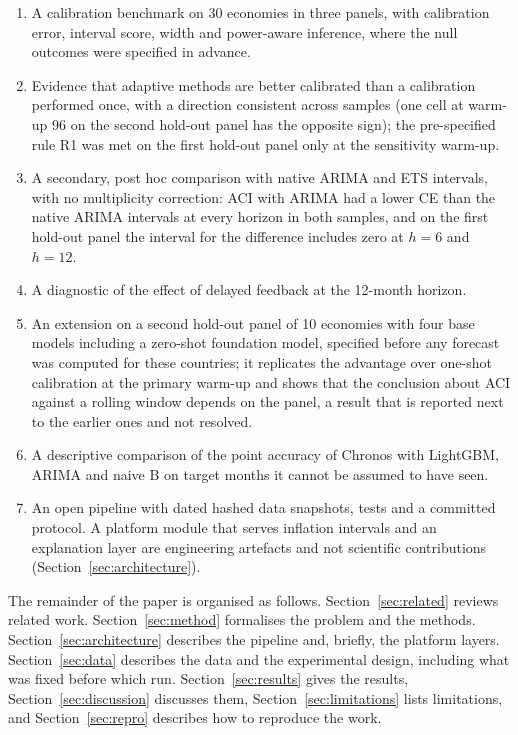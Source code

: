 \begin{enumerate}
\item A calibration benchmark on 30 economies in three panels, with calibration error, interval score, width and power-aware inference, where the null outcomes were specified in advance.
\item Evidence that adaptive methods are better calibrated than a calibration performed once, with a direction consistent across samples (one cell at warm-up 96 on the second hold-out panel has the opposite sign); the pre-specified rule R1 was met on the first hold-out panel only at the sensitivity warm-up.
\item A secondary, post hoc comparison with native ARIMA and ETS intervals, with no multiplicity correction: ACI with ARIMA had a lower CE than the native ARIMA intervals at every horizon in both samples, and on the first hold-out panel the interval for the difference includes zero at $h=6$ and $h=12$.
\item A diagnostic of the effect of delayed feedback at the 12-month horizon.
\item An extension on a second hold-out panel of 10 economies with four base models including a zero-shot foundation model, specified before any forecast was computed for these countries; it replicates the advantage over one-shot calibration at the primary warm-up and shows that the conclusion about ACI against a rolling window depends on the panel, a result that is reported next to the earlier ones and not resolved.
\item A descriptive comparison of the point accuracy of Chronos with LightGBM, ARIMA and naive B on target months it cannot be assumed to have seen.
\item An open pipeline with dated hashed data snapshots, tests and a committed protocol. A platform module that serves inflation intervals and an explanation layer are engineering artefacts and not scientific contributions (Section~\ref{sec:architecture}).
\end{enumerate}

The remainder of the paper is organised as follows. Section~\ref{sec:related} reviews related work. Section~\ref{sec:method} formalises the problem and the methods. Section~\ref{sec:architecture} describes the pipeline and, briefly, the platform layers. Section~\ref{sec:data} describes the data and the experimental design, including what was fixed before which run. Section~\ref{sec:results} gives the results, Section~\ref{sec:discussion} discusses them, Section~\ref{sec:limitations} lists limitations, and Section~\ref{sec:repro} describes how to reproduce the work.
